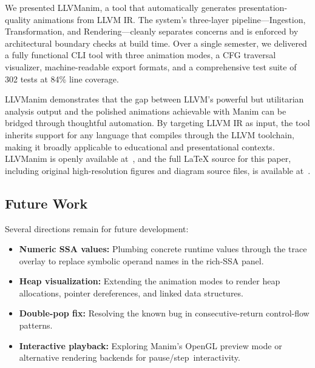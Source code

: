 We presented LLVManim, a tool that automatically generates presentation-quality animations from LLVM IR. The system's three-layer pipeline---Ingestion, Transformation, and Rendering---cleanly separates concerns and is enforced by architectural boundary checks at build time. Over a single semester, we delivered a fully functional CLI tool with three animation modes, a CFG traversal visualizer, machine-readable export formats, and a comprehensive test suite of 302 tests at 84\% line coverage.

LLVManim demonstrates that the gap between LLVM's powerful but utilitarian analysis output and the polished animations achievable with Manim can be bridged through thoughtful automation. By targeting LLVM IR as input, the tool inherits support for any language that compiles through the LLVM toolchain, making it broadly applicable to educational and presentational contexts. LLVManim is openly available at~\cite{llvmanim-repo}, and the full \LaTeX{} source for this paper, including original high-resolution figures and diagram source files, is available at~\cite{llvmanim-paper-repo}.


\subsection*{\centering Future Work}
Several directions remain for future development:
\begin{itemize}
    \item \textbf{Numeric SSA values:} Plumbing concrete runtime values through the trace overlay to replace symbolic operand names in the rich-SSA panel.
    \item \textbf{Heap visualization:} Extending the animation modes to render heap allocations, pointer dereferences, and linked data structures.
    \item \textbf{Double-pop fix:} Resolving the known bug in consecutive-return control-flow patterns.
    \item \textbf{Interactive playback:} Exploring Manim's OpenGL preview mode or alternative rendering backends for pause/step~interactivity.
\end{itemize}
